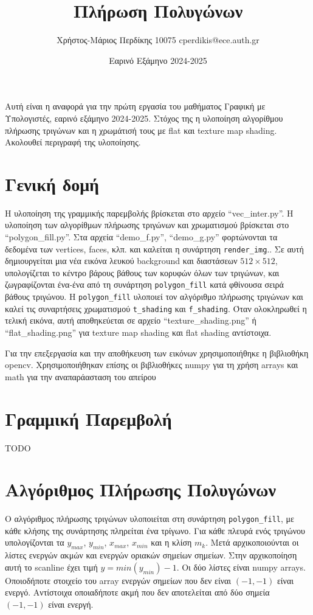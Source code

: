 \documentclass{article}
\title{Πλήρωση Πολυγώνων}
\date{Εαρινό Εξάμηνο 2024-2025}
\author{Χρήστος-Μάριος Περδίκης 10075 cperdikis@ece.auth.gr}
\begin{document}
\maketitle

Αυτή είναι η αναφορά για την πρώτη εργασία του μαθήματος Γραφική με 
Υπολογιστές, εαρινό εξάμηνο 2024-2025. Στόχος της η υλοποίηση αλγορίθμου
πλήρωσης τριγώνων και η χρωμάτισή τους με flat και texture map
shading. Ακολουθεί περιγραφή της υλοποίησης.

\section{Γενική δομή}
Η υλοποίηση της γραμμικής παρεμβολής βρίσκεται στο αρχείο ``vec\_inter.py''. 
Η υλοποίηση των αλγορίθμων πλήρωσης τριγώνων και χρωματισμού βρίσκεται στο
``polygon\_fill.py''. Στα αρχεία ``demo\_f.py'', ``demo\_g.py'' φορτώνονται 
τα δεδομένα των vertices, faces, κλπ. και καλείται η συνάρτηση \verb|render_img|..
Σε αυτή δημιουργείται μια νέα εικόνα λευκού background και διαστάσεων $512\times512$, υπολογίζεται το κέντρο 
βάρους βάθους των κορυφών όλων των τριγώνων, και ζωγραφίζονται 
ένα-ένα από τη συνάρτηση \verb|polygon_fill| κατά φθίνουσα σειρά βάθους τριγώνου.
Η \verb|polygon_fill| υλοποιεί τον αλγόριθμο πλήρωσης τριγώνων και καλεί τις 
συναρτήσεις χρωματισμού \verb|t_shading| και \verb|f_shading|. Όταν ολοκληρωθεί 
η τελική εικόνα, αυτή αποθηκεύεται σε αρχείο ``texture\_shading.png'' ή ``flat\_shading.png''
για texture map shading και flat shading αντίστοιχα.

Για την επεξεργασία και την αποθήκευση των εικόνων χρησιμοποιήθηκε η βιβλιοθήκη
opencv. Χρησιμοποιήθηκαν επίσης οι βιβλιοθήκες numpy για τη χρήση arrays και
math για την αναπαράασταση του απείρου

\section{Γραμμική Παρεμβολή}
TODO

\section{Αλγόριθμος Πλήρωσης Πολυγώνων}
Ο αλγόριθμος πλήρωσης τριγώνων υλοποιείται στη συνάρτηση \verb|polygon_fill|,
με κάθε κλήσης της συνάρτησης πληρείται ένα τρίγωνο. Για κάθε πλευρά ενός 
τριγώνου υπολογίζονται τα $y_{max}$, $y_{min}$, $x_{max}$, $x_{min}$ 
και η κλίση $m_k$. Μετά αρχικοποιούνται οι λίστες ενεργών ακμών και ενεργών 
οριακών σημείων σημείων. Στην αρχικοποίηση αυτή το scanline έχει τιμή $y = min(y_{min}) - 1$.
Οι δύο λίστες είναι numpy arrays. Οποιοδήποτε στοιχείο του array ενεργών σημείων που δεν 
είναι $(-1, -1)$ είναι ενεργό. Αντίστοιχα οποιαδήποτε ακμή που δεν αποτελείται από 
δύο σημεία $(-1, -1)$ είναι ενεργή.
\end{document}
